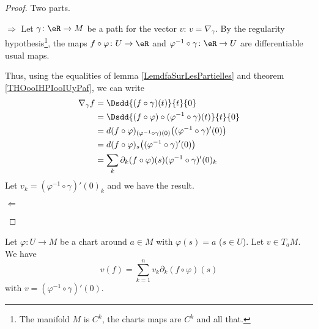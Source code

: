 \begin{proof}
    Two parts.
    \begin{subproof}
    \item[\( \Rightarrow\)]
    Let \( \gamma\colon \eR\to M\) be a path for the vector \( v\): \( v=\nabla_{\gamma}\). By the regularity hypothesis\footnote{The manifold \( M\) is \( C^k\), the charts maps are \( C^k\) and all that.}, the maps \( f\circ \varphi\colon U\to \eR\) and \( \varphi^{-1}\circ\gamma\colon \eR \to U \) are differentiable usual maps.

    Thus, using the equalities of lemma \ref{LemdfaSurLesPartielles} and theorem \ref{THOooIHPIooIUyPaf}, we can write
    \begin{subequations}
        \begin{align}
            \nabla_{\gamma}f&=\Dsdd{ (f\circ\gamma)(t) }{t}{0}\\
            &=\Dsdd{ (f\circ\varphi)\circ(\varphi^{-1}\circ\gamma)(t) }{t}{0}\\
            &=d(f\circ \varphi)_{(\varphi^{-1}\circ\gamma)(0)}\big( (\varphi^{-1}\circ\gamma)'(0) \big)\\
            &=d(f\circ \varphi)_{s}\big( (\varphi^{-1}\circ\gamma)'(0) \big)\\
            &=\sum_k\partial_k(f\circ \varphi)(s)(\varphi^{-1}\circ\gamma)'(0)_k
        \end{align}
    \end{subequations}
    Let \( v_k=(\varphi^{-1}\circ\gamma)'(0)_k\) and we have the result.
\item[$ \Leftarrow$ ]
    \end{subproof}
\end{proof}

\begin{lemma}       \label{LEMooZXEFooZgXbNP}
    Let \( \varphi\colon U\to M\) be a chart around \( a\in M\) with \( \varphi(s)=a\) (\( s\in U\)). Let \( v\in T_aM\). We have
    \begin{equation}       
        v(f)=\sum_{k=1}^nv_k\partial_k(f\circ \varphi)(s)
    \end{equation}
    with \( v= (\varphi^{-1}\circ \gamma)'(0)\).
\end{lemma}

